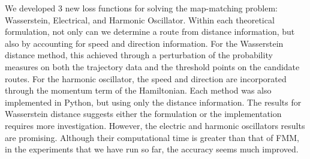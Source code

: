 \documentclass{article}
\numberwithin{equation}{section}
\theoremstyle{definition}
\begin{document}
We developed 3 new loss functions for solving the map-matching problem: Wasserstein, Electrical, and Harmonic Oscillator. Within each theoretical formulation, not only can we determine a route from distance information, but also by accounting for speed and direction information. For the Wasserstein distance method, this achieved through a perturbation of the probability measures on both the trajectory data and the threshold points on the candidate routes. For the harmonic oscillator, the speed and direction are incorporated through the momentum term of the Hamiltonian. Each method was also implemented in Python, but using only the distance information. The results for Wasserstein distance suggests either the formulation or the implementation requires more investigation. However, the electric and harmonic oscillators results are promising. Although their computational time is greater than that of FMM, in the experiments that we have run so far, the accuracy seems much improved.
\end{document}
